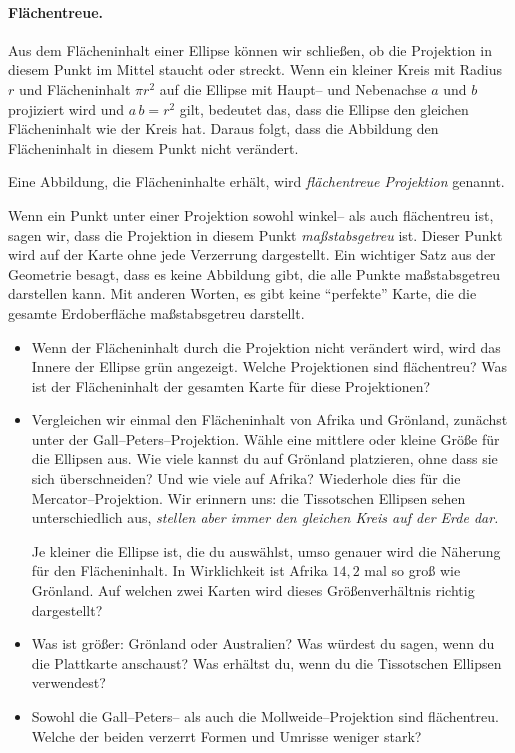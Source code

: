\documentclass[a4paper,12pt]{article}
\begin{document}
\paragraph{Flächentreue.} 
Aus dem Flächeninhalt einer Ellipse können wir schließen, ob die Projektion 
in diesem Punkt im Mittel staucht oder streckt. Wenn ein kleiner Kreis mit Radius $r$ 
und Flächeninhalt $\pi r^2$ auf die Ellipse mit Haupt-- und Nebenachse
$a$ und $b$ projiziert wird und $a\,b = r^2$ gilt, bedeutet das, dass die Ellipse 
den gleichen Flächeninhalt wie der Kreis hat. Daraus folgt, dass die Abbildung den 
Flächeninhalt in diesem Punkt nicht verändert. 

Eine Abbildung, die Flächeninhalte erhält, wird \emph{flächentreue Projektion} genannt.

Wenn ein Punkt unter einer Projektion sowohl winkel-- als auch flächentreu ist, sagen 
wir, dass die Projektion in diesem Punkt \emph{maßstabsgetreu} ist. Dieser Punkt wird
auf der Karte ohne jede Verzerrung dargestellt. Ein wichtiger Satz aus der Geometrie
besagt, dass es keine Abbildung gibt, die alle Punkte maßstabsgetreu darstellen kann. 
Mit anderen Worten, es gibt keine "`perfekte"' Karte, die die gesamte Erdoberfläche 
maßstabsgetreu darstellt.

\begin{itemize}
 \item Wenn der Flächeninhalt durch die Projektion nicht verändert wird, wird das 
       Innere der Ellipse grün angezeigt. Welche Projektionen sind flächentreu? Was 
       ist der Flächeninhalt der gesamten Karte für diese Projektionen? 
 \item Vergleichen wir einmal den Flächeninhalt von Afrika und Grönland, zunächst unter 
       der Gall--Peters--Projektion. Wähle eine mittlere oder kleine Größe für die 
       Ellipsen aus. Wie viele kannst du auf Grönland platzieren, ohne dass sie sich 
       überschneiden? Und wie viele auf Afrika? Wiederhole dies für die 
       Mercator--Projektion. Wir erinnern uns: die Tissotschen Ellipsen sehen 
       unterschiedlich aus, \emph{stellen aber immer den gleichen Kreis auf der Erde 
       dar.}

       Je kleiner die Ellipse ist, die du auswählst, umso genauer wird die Näherung für 
       den Flächeninhalt. In Wirklichkeit ist Afrika $14{,}2$ mal so groß wie Grönland.
       Auf welchen zwei Karten wird dieses Größenverhältnis richtig dargestellt?
 \item Was ist größer: Grönland oder Australien? Was würdest du sagen, wenn du die 
       Plattkarte anschaust? Was erhältst du, wenn du die Tissotschen Ellipsen 
       verwendest?
 \item Sowohl die Gall--Peters-- als auch die Mollweide--Projektion sind flächentreu.
       Welche der beiden verzerrt Formen und Umrisse weniger stark?
 \end{itemize}
\end{document}
